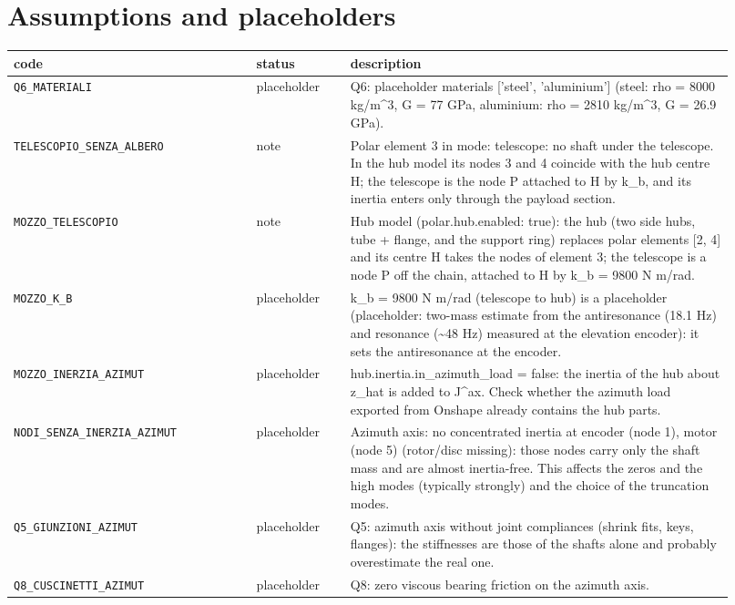 \documentclass[10pt,a4paper]{article}
\numberwithin{equation}{section}
\begin{document}
\section{Assumptions and placeholders}\label{sec:assumptions}
\begin{longtable}{p{0.31\linewidth}p{0.12\linewidth}p{0.49\linewidth}}
\toprule code & status & description \\ \midrule\endhead
\texttt{Q6\_MATERIALI} & placeholder & Q6: placeholder materials ['steel', 'aluminium'] (steel: rho = 8000 kg/m\^{}3, G = 77 GPa, aluminium: rho = 2810 kg/m\^{}3, G = 26.9 GPa). \\
\texttt{TELESCOPIO\_SENZA\_ALBERO} & note & Polar element 3 in mode: telescope: no shaft under the telescope. In the hub model its nodes 3 and 4 coincide with the hub centre H; the telescope is the node P attached to H by k\_b, and its inertia enters only through the payload section. \\
\texttt{MOZZO\_TELESCOPIO} & note & Hub model (polar.hub.enabled: true): the hub (two side hubs, tube + flange, and the support ring) replaces polar elements [2, 4] and its centre H takes the nodes of element 3; the telescope is a node P off the chain, attached to H by k\_b = 9800 N m/rad. \\
\texttt{MOZZO\_K\_B} & placeholder & k\_b = 9800 N m/rad (telescope to hub) is a placeholder (placeholder: two-mass estimate from the antiresonance (18.1 Hz) and resonance (\textasciitilde{}48 Hz) measured at the elevation encoder): it sets the antiresonance at the encoder. \\
\texttt{MOZZO\_INERZIA\_AZIMUT} & placeholder & hub.inertia.in\_azimuth\_load = false: the inertia of the hub about z\_hat is added to J\^{}ax. Check whether the azimuth load exported from Onshape already contains the hub parts. \\
\texttt{NODI\_SENZA\_INERZIA\_AZIMUT} & placeholder & Azimuth axis: no concentrated inertia at encoder (node 1), motor (node 5) (rotor/disc missing): those nodes carry only the shaft mass and are almost inertia-free. This affects the zeros and the high modes (typically strongly) and the choice of the truncation modes. \\
\texttt{Q5\_GIUNZIONI\_AZIMUT} & placeholder & Q5: azimuth axis without joint compliances (shrink fits, keys, flanges): the stiffnesses are those of the shafts alone and probably overestimate the real one. \\
\texttt{Q8\_CUSCINETTI\_AZIMUT} & placeholder & Q8: zero viscous bearing friction on the azimuth axis. \\

\end{longtable}
\end{document}
